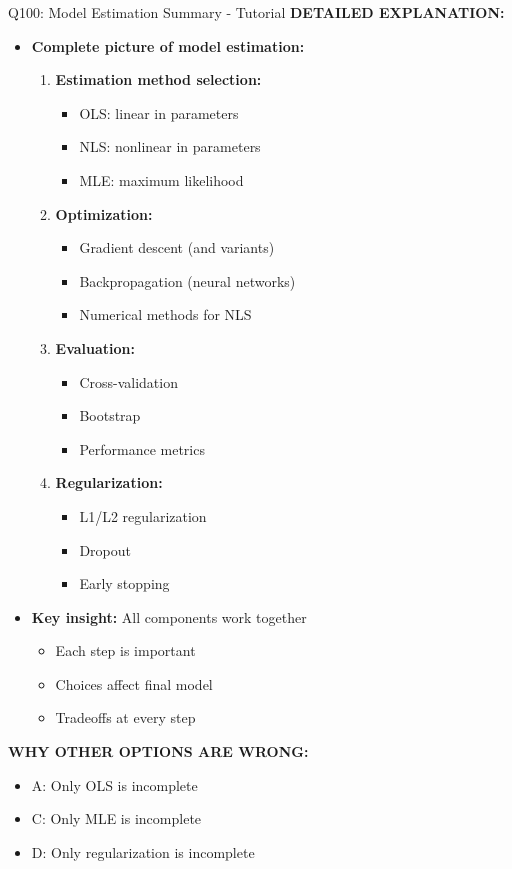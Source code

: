 \documentclass[8pt]{beamer}
\begin{document}
\begin{frame}{Q100: Model Estimation Summary - Tutorial}
		\vspace{0.05cm}
		\textbf{DETAILED EXPLANATION:}
		\begin{itemize}
			\item \textbf{Complete picture of model estimation:}
			\begin{enumerate}
				\item \textbf{Estimation method selection:}
				\begin{itemize}
					\item OLS: linear in parameters
					\item NLS: nonlinear in parameters
					\item MLE: maximum likelihood
				\end{itemize}
				\item \textbf{Optimization:}
				\begin{itemize}
					\item Gradient descent (and variants)
					\item Backpropagation (neural networks)
					\item Numerical methods for NLS
				\end{itemize}
				\item \textbf{Evaluation:}
				\begin{itemize}
					\item Cross-validation
					\item Bootstrap
					\item Performance metrics
				\end{itemize}
				\item \textbf{Regularization:}
				\begin{itemize}
					\item L1/L2 regularization
					\item Dropout
					\item Early stopping
				\end{itemize}
			\end{enumerate}
			\item \textbf{Key insight:} All components work together
			\begin{itemize}
				\item Each step is important
				\item Choices affect final model
				\item Tradeoffs at every step
			\end{itemize}
		\end{itemize}
		
		\vspace{0.05cm}
		\textcolor{myred}{\textbf{WHY OTHER OPTIONS ARE WRONG:}}
		\begin{itemize}
			\item \textcolor{myred}{A:} Only OLS is incomplete
			\item \textcolor{myred}{C:} Only MLE is incomplete
			\item \textcolor{myred}{D:} Only regularization is incomplete
		\end{itemize}
		

\end{frame}
\end{document}
